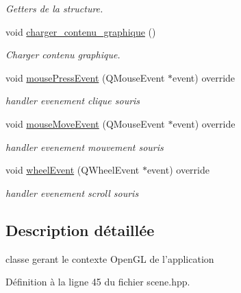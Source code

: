 \begin{DoxyCompactItemize}
\begin{DoxyCompactList}\small\item\em Getters de la structure. \end{DoxyCompactList}\item 
void \hyperlink{classSceneGL_a409672c6feccc6d1d6bc5dcdcfa7e9c6}{charger\+\_\+contenu\+\_\+graphique} ()
\begin{DoxyCompactList}\small\item\em Charger contenu graphique. \end{DoxyCompactList}\item 
void \hyperlink{classSceneGL_a9da729a38d1765fb28444ef032f56f84}{mouse\+Press\+Event} (Q\+Mouse\+Event $\ast$event) override
\begin{DoxyCompactList}\small\item\em handler evenement clique souris \end{DoxyCompactList}\item 
void \hyperlink{classSceneGL_af057296bff1d5ffc94e22144aff358c7}{mouse\+Move\+Event} (Q\+Mouse\+Event $\ast$event) override
\begin{DoxyCompactList}\small\item\em handler evenement mouvement souris \end{DoxyCompactList}\item 
void \hyperlink{classSceneGL_abf3361d8d735934b85961bb949a3020c}{wheel\+Event} (Q\+Wheel\+Event $\ast$event) override
\begin{DoxyCompactList}\small\item\em handler evenement scroll souris \end{DoxyCompactList}\end{DoxyCompactItemize}


\subsection{Description détaillée}
classe gerant le contexte Open\+G\+L de l'application 

Définition à la ligne 45 du fichier scene.\+hpp.



